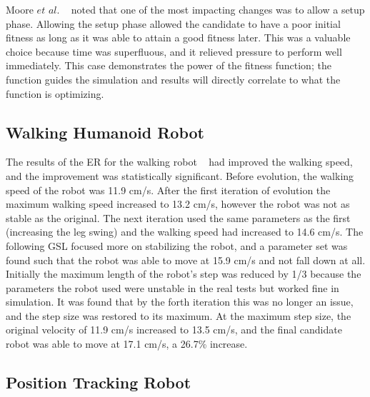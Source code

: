 \documentclass{sig-alternate}
\begin{document}
  
  Moore $et$ $al.$ ~\cite{Moore:2013:ESK:2463372.2463402} noted that one of the most impacting changes was to allow a setup phase. Allowing the setup phase allowed the candidate to have a poor initial fitness as long as it was able to attain a good fitness later. This was a valuable choice because time was superfluous, and it relieved pressure to perform well immediately. This case demonstrates the power of the fitness function; the function guides the simulation and results will directly correlate to what the function is optimizing. 
  


  \subsection{Walking Humanoid Robot}\label{Farchy behavior}
  
	The results of the ER for the walking robot  ~\cite{Farchy:2013:HRL:2484920.2484930} had improved the walking speed, and the improvement was statistically significant. Before evolution, the walking speed of the robot was 11.9 cm/s. After the first iteration of evolution the maximum walking speed increased to 13.2 cm/s, however the robot was not as stable as the original. The next iteration used the same parameters as the first (increasing the leg swing) and the walking speed had increased to 14.6 cm/s. The following GSL focused more on stabilizing the robot, and a parameter set was found such that the robot was able to move at 15.9 cm/s and not fall down at all. Initially the maximum length of the robot's step was reduced by 1/3 because the parameters the robot used were unstable in the real tests but worked fine in simulation. It was found that by the forth iteration this was no longer an issue, and the step size was restored to its maximum. At the maximum step size, the original velocity of 11.9 cm/s increased to 13.5 cm/s, and the final candidate robot was able to move at 17.1 cm/s, a 26.7\% increase.
	
	\subsection{Position Tracking Robot}\label{Pretorius behavior}
	
\end{document}

